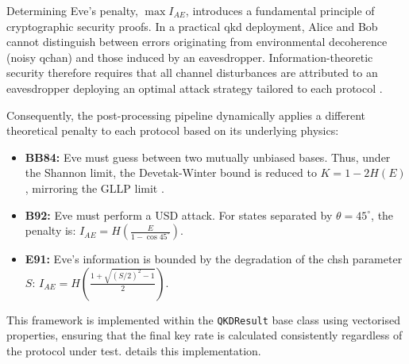 Determining Eve's penalty, $\max I_{AE}$, introduces a fundamental principle of cryptographic security proofs. In a practical \gls{qkd} deployment, Alice and Bob cannot distinguish between errors originating from environmental decoherence (noisy \gls{qchan}) and those induced by an eavesdropper. Information-theoretic security therefore requires that all channel disturbances are attributed to an eavesdropper deploying an optimal attack strategy tailored to each protocol \cite{DWbound2005}. 

Consequently, the post-processing pipeline dynamically applies a different theoretical penalty to each protocol based on its underlying physics: 

\begin{itemize}
    \item \textbf{BB84:} Eve must guess between two mutually unbiased bases. Thus, under the Shannon limit, the Devetak-Winter bound is reduced to $K = 1 - 2H(E)$, mirroring the GLLP limit \cite{GLLP2004}.
    \item \textbf{B92:} Eve must perform a USD attack. For states separated by $\theta = 45^\circ$, the penalty is: $I_{AE} = H\left(\frac{E}{1 - \cos 45^\circ}\right)$.
    \item \textbf{E91:} Eve's information is bounded by the degradation of the \gls{chsh} parameter $S$: $I_{AE} = H\left(\frac{1 + \sqrt{(S/2)^2 - 1}}{2}\right)$.
\end{itemize} 

This framework is implemented within the \texttt{QKDResult} base class using vectorised properties, ensuring that the final key rate is calculated consistently regardless of the protocol under test.  details this implementation.

